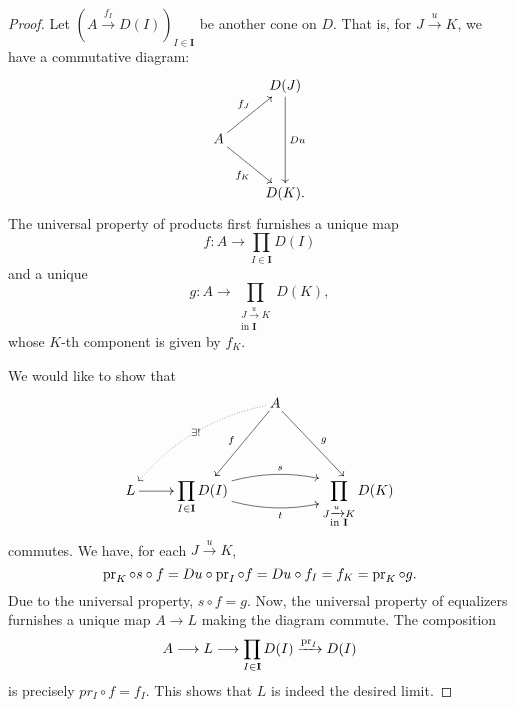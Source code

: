 \begin{proof}
    Let $\left(A\xrightarrow{f_I} D(I)\right)_{I\in\mathbf{I}}$ be another cone on $D$. That is, for $J\xrightarrow{u} K$, we have a commutative diagram: 
    \begin{equation*}
        \xymatrix {
            & D(J)\ar[dd]^{Du}\\
            A\ar[ru]^{f_J}\ar[rd]_{f_K} & \\
            & D(K).
        }
    \end{equation*}
    The universal property of products first furnishes a unique map 
    \begin{equation*}
        f: A\longrightarrow\prod_{I\in\mathbf{I}} D(I)
    \end{equation*}
    and a unique 
    \begin{equation*}
        g: A\longrightarrow\prod_{\substack{J\xrightarrow{u}K\\\text{in }\mathbf{I}}} D(K),
    \end{equation*}
    whose $K$-th component is given by $f_K$.

    We would like to show that 
    \begin{equation*}
        \xymatrix@R+1pc {
            && A\ar[ld]_{f}\ar[rd]^g\ar@{.>}@/_1pc/[lld]|-{\exists!} &\\
            L\ar[r] & \displaystyle\prod_{I\in\mathbf{I}} D(I)\ar@/^1pc/[rr]^s\ar@/_1pc/[rr]_t && \displaystyle\prod_{\substack{J\xrightarrow{u}K\\\text{in }\mathbf{I}}} D(K)
        }
    \end{equation*}
    commutes. We have, for each $J\xrightarrow{u} K$, 
    \begin{equation*}
        \operatorname{pr}_K\circ s\circ f = Du\circ\operatorname{pr}_I\circ f = Du\circ f_I = f_K = \operatorname{pr}_K\circ g.
    \end{equation*}
    Due to the universal property, $s\circ f = g$. Now, the universal property of equalizers furnishes a unique map $A\to L$ making the diagram commute. The composition 
    \begin{equation*}
        A\longrightarrow L\longrightarrow\prod_{I\in\mathbf{I}} D(I)\xrightarrow{\operatorname{pr}_I} D(I)
    \end{equation*}
    is precisely $pr_I\circ f = f_I$. This shows that $L$ is indeed the desired limit.
\end{proof}